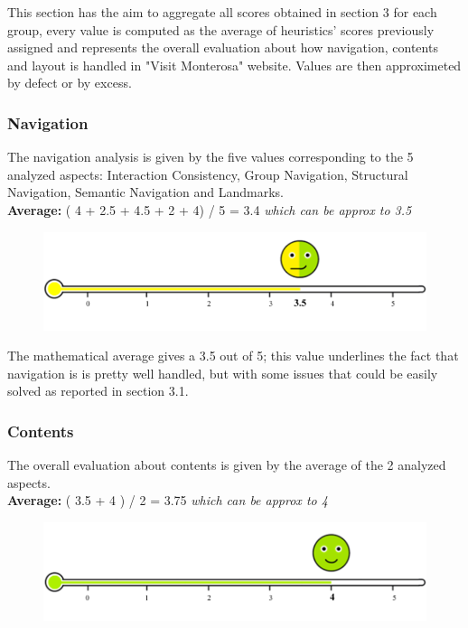 This section has the aim to aggregate all scores obtained in section 3 for each group, every value is computed as the average of heuristics' scores previously assigned and represents the overall evaluation about how navigation, contents and layout  is handled in "Visit Monterosa" website. Values are then approximeted by defect or by excess.

\subsubsection*{Navigation}
The navigation analysis is given by the five values corresponding to the 5 analyzed aspects: Interaction Consistency, Group Navigation, Structural Navigation, Semantic Navigation and Landmarks.\\
\textbf{Average: } ( 4 + 2.5 + 4.5 + 2 + 4) / 5 = 3.4  \emph{which can be approx to 3.5}\\
\begin{figure}[h!]
	\centering
	\begin{minipage}[b]{1\textwidth}
    		\includegraphics[width=1\textwidth]{./assets/layout-navigation-value.png}
	\end{minipage}
\end{figure}
\FloatBarrier

The mathematical average gives a 3.5 out of 5; this value underlines the fact that navigation is is pretty well handled, but with some issues that could be easily solved as reported in section 3.1.

\subsubsection*{Contents}
The overall evaluation about contents is given by the average of the 2 analyzed aspects.\\
\textbf{Average: } ( 3.5 + 4 ) / 2 = 3.75  \emph{which can be approx to 4}\\
\begin{figure}[h!]
	\centering
	\begin{minipage}[b]{1\textwidth}
    		\includegraphics[width=1\textwidth]{./assets/contents-value.png}
	\end{minipage}
\end{figure}
\FloatBarrier

